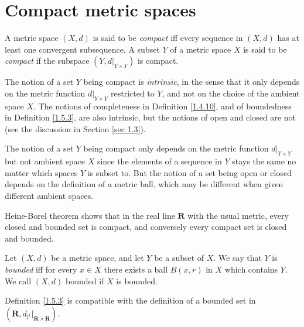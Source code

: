 \section{Compact metric spaces}\label{sec 1.5}

\begin{definition}[Compactness]\label{1.5.1}
    A metric space \((X, d)\) is said to be \emph{compact} iff every sequence in \((X, d)\) has at least one convergent subsequence.
    A subset \(Y\) of a metric space \(X\) is said to be \emph{compact} if the subspace \((Y, d|_{Y \times Y})\) is compact.
\end{definition}

\begin{remark}\label{1.5.2}
    The notion of a set \(Y\) being compact is \emph{intrinsic}, in the sense that it only depends on the metric function \(d|_{Y \times Y}\) restricted to \(Y\), and not on the choice of the ambient space \(X\).
    The notions of completeness in Definition \ref{1.4.10}, and of boundedness in Definition \ref{1.5.3}, are also intrinsic, but the notions of open and closed are not
    (see the discussion in Section \ref{sec 1.3}).
\end{remark}

\begin{note}
    The notion of a set \(Y\) being compact only depends on the metric function \(d|_{Y \times Y}\) but not ambient space \(X\) since the elements of a sequence in \(Y\) stays the same no matter which spaces \(Y\) is subset to.
    But the notion of a set being open or closed depends on the definition of a metric ball, which may be different when given different ambient spaces.
\end{note}

\begin{note}
    Heine-Borel theorem shows that in the real line \(\mathbf{R}\) with the usual metric, every closed and bounded set is compact, and conversely every compact set is closed and bounded.
\end{note}

\begin{definition}\label{1.5.3}
    Let \((X, d)\) be a metric space, and let \(Y\) be a subset of \(X\).
    We say that \(Y\) is \emph{bounded} iff for every \(x \in X\) there exists a ball \(B(x, r)\) in \(X\) which contains \(Y\).
    We call \((X, d)\) bounded if \(X\) is bounded.
\end{definition}

\begin{remark}\label{1.5.4}
    Definition \ref{1.5.3} is compatible with the definition of a bounded set in \((\mathbf{R}, d_{l^1}|_{\mathbf{R} \times \mathbf{R}})\).
\end{remark}

